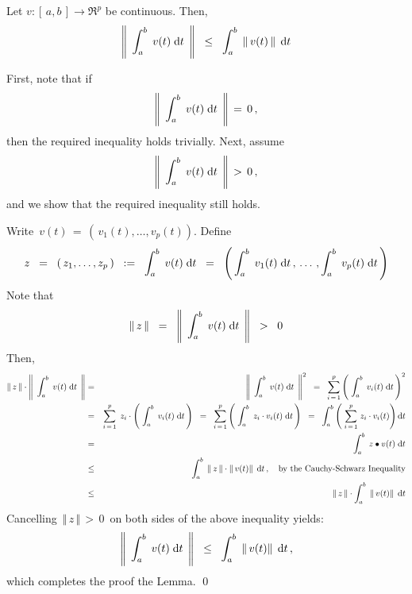 
\begin{lemma}\label{vectorNormOfIntegralLessThanInteralOfNorm}
\mbox{}
\vskip 0.1cm
\noindent
Let $v : [\,a,b\,] \longrightarrow \Re^{p}$ be continuous.
Then,
\begin{equation*}
\left\Vert\;\, \int_{a}^{b}\; v(t) \;\textnormal{d} t \,\;\right\Vert
\;\; \leq \;\;
	\int_{a}^{b}\; \left\Vert\, v(t) \,\right\Vert \;\textnormal{d} t
\end{equation*}
\end{lemma}
\proof
First, note that if
\begin{equation*}
\left\Vert\;\, \int_{a}^{b}\; v(t) \;\textnormal{d} t \,\;\right\Vert \, = \, 0\,,
\end{equation*}
then the required inequality holds trivially.
Next, assume
\begin{equation*}
\left\Vert\;\, \int_{a}^{b}\; v(t) \;\textnormal{d} t \,\;\right\Vert \, > \, 0\,,
\end{equation*}
and we show that the required inequality still holds.

\vskip 0.5cm
\noindent
Write \,$v(t) \,=\, \left(\,v_{1}(t),\ldots,v_{p}(t)\right)$.
Define
\begin{equation*}
z
\;\; = \;\;
	(\,z_{1},\ldots,z_{p}\,)
\;\; := \;\;
	\int_{a}^{b}\; v(t) \;\textnormal{d} t
\;\; = \;\;
	\left(\,
		\int_{a}^{b}\; v_{1}(t) \;\textnormal{d} t\,,
		\,\ldots\,,
		\int_{a}^{b}\; v_{p}(t) \;\textnormal{d} t
		\,\right)
\end{equation*}
Note that
\begin{equation*}
\Vert\, z \,\Vert
\;\; = \;\;
	\left\Vert\;\, \int_{a}^{b}\; v(t) \;\textnormal{d} t \,\;\right\Vert
\;\; > \;\;
	0
\end{equation*}
Then,
\begin{eqnarray*}
\Vert\, z \,\Vert \cdot \left\Vert\;\, \int_{a}^{b}\; v(t) \;\textnormal{d} t \,\;\right\Vert
& = &
	\left\Vert\;\, \int_{a}^{b}\; v(t) \;\textnormal{d} t \,\;\right\Vert^{2}
\;\; = \;\;
	\overset{p}{\underset{i\,=\,1}{\sum}}
	\left(\;
		\int_{a}^{b}\; v_{i}(t) \;\textnormal{d} t
		\,\right)^{2}
\\
& = &
	\overset{p}{\underset{i\,=\,1}{\sum}}\;\,
	z_{i} \cdot \left(\; \int_{a}^{b}\; v_{i}(t) \;\textnormal{d} t \,\right)
\;\; = \;\;
	\overset{p}{\underset{i\,=\,1}{\sum}}
	\left(\; \int_{a}^{b}\; z_{i} \cdot v_{i}(t) \;\textnormal{d} t \,\right)
\;\; = \;\;
	\int_{a}^{b}
		\left(\;
			\overset{p}{\underset{i\,=\,1}{\sum}}\;
			z_{i} \cdot v_{i}(t)
			\right)
		\textnormal{d} t
\\
& = &
	\int_{a}^{b}\; z \bullet v(t) \;\textnormal{d} t
\\
& \leq &
	\int_{a}^{b}\; \Vert\,z\,\Vert \cdot \Vert\,v(t)\Vert \,\;\textnormal{d} t\,,
	\quad
	\textnormal{by the Cauchy-Schwarz Inequality}
\\
& \leq &
	\Vert\,z\,\Vert \cdot \int_{a}^{b}\; \Vert\,v(t)\Vert \,\;\textnormal{d} t
\end{eqnarray*}
Cancelling \,$\Vert\,z\,\Vert \,>\, 0$\, on both sides of the above inequality yields:
\begin{equation*}
\left\Vert\;\, \int_{a}^{b}\; v(t) \;\textnormal{d} t \,\;\right\Vert
\;\; \leq \;\;
	\int_{a}^{b}\; \Vert\,v(t)\Vert \,\;\textnormal{d} t\,,
\end{equation*}
which completes the proof the Lemma.
\qed


